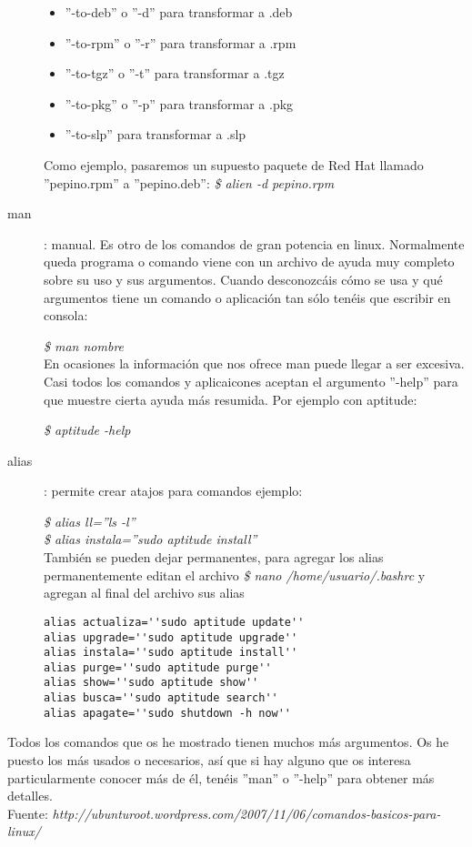 \documentclass[12pt,spanish,lettersize,twocolumn]{article}
\begin{document}
\begin{description}
\begin{itemize}
\item ''-to-deb'' o ''-d'' para transformar a .deb
\item ''-to-rpm'' o ''-r'' para transformar a .rpm
\item ''-to-tgz'' o ''-t'' para transformar a .tgz
\item ''-to-pkg'' o ''-p'' para transformar a .pkg
\item ''-to-slp'' para transformar a .slp
\end{itemize}

Como ejemplo, pasaremos un supuesto paquete de Red Hat llamado ''pepino.rpm'' a ''pepino.deb'':
\emph{\$ alien -d pepino.rpm}\\

\item[man]: manual. Es otro de los comandos de gran potencia en linux. Normalmente queda programa o comando viene con un archivo de ayuda muy completo sobre su uso y sus argumentos. Cuando desconozc\'ais c\'omo se usa y qu\'e argumentos tiene un comando o aplicaci\'on tan s\'olo ten\'eis que escribir en consola:

\emph{\$ man nombre}\\

En ocasiones la informaci\'on que nos ofrece man puede llegar a ser excesiva. Casi todos los comandos y aplicaicones aceptan el argumento ''-help'' para que muestre cierta ayuda m\'as resumida. Por ejemplo con aptitude:

\emph{\$ aptitude -help}
\item[alias]: permite crear atajos para comandos
ejemplo:

\emph{\$ alias ll=''ls -l''}\\
\emph{\$ alias instala=''sudo aptitude install''}\\

Tambi\'en se pueden dejar permanentes, para agregar los alias permanentemente editan el archivo \emph{\$ nano /home/usuario/.bashrc}
y agregan al final del archivo sus alias

\begin{verbatim}
alias actualiza=''sudo aptitude update''
alias upgrade=''sudo aptitude upgrade''
alias instala=''sudo aptitude install''
alias purge=''sudo aptitude purge''
alias show=''sudo aptitude show''
alias busca=''sudo aptitude search''
alias apagate=''sudo shutdown -h now''
\end{verbatim}
\end{description}
Todos los comandos que os he mostrado tienen muchos m\'as argumentos. Os he puesto los m\'as usados o necesarios, as\'i que si hay alguno que os interesa particularmente conocer m\'as de \'el, ten\'eis ''man'' o ''-help'' para obtener m\'as detalles.\\

Fuente: \emph{http://ubunturoot.wordpress.com/2007/11/06/comandos-basicos-para-linux/}
\end{document}
